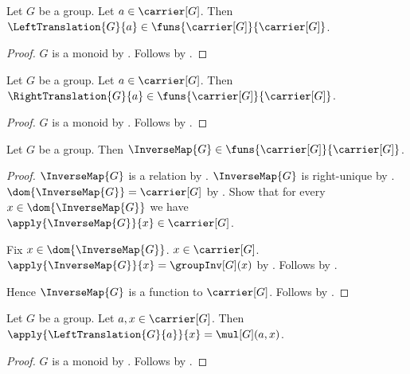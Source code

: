\begin{proposition}\label{left_translation_function}
    Let $G$ be a group.
    Let $a\in\carrier[G]$.
    Then $\LeftTranslation{G}{a}\in
        \funs{\carrier[G]}{\carrier[G]}$.
\end{proposition}
\begin{proof}
    $G$ is a monoid by .
    Follows by .
\end{proof}

\begin{proposition}\label{right_translation_function}
    Let $G$ be a group.
    Let $a\in\carrier[G]$.
    Then $\RightTranslation{G}{a}\in
        \funs{\carrier[G]}{\carrier[G]}$.
\end{proposition}
\begin{proof}
    $G$ is a monoid by .
    Follows by .
\end{proof}

\begin{proposition}\label{inverse_map_function}
    Let $G$ be a group.
    Then $\InverseMap{G}\in\funs{\carrier[G]}{\carrier[G]}$.
\end{proposition}
\begin{proof}
    $\InverseMap{G}$ is a relation
        by .
    $\InverseMap{G}$ is right-unique
        by .
    $\dom{\InverseMap{G}}=\carrier[G]$
        by .
    Show that for every $x\in\dom{\InverseMap{G}}$ we have
        $\apply{\InverseMap{G}}{x}\in\carrier[G]$.
    \begin{subproof}
        Fix $x\in\dom{\InverseMap{G}}$.
        $x\in\carrier[G]$.
        $\apply{\InverseMap{G}}{x}=\groupInv[G](x)$
            by .
        Follows by .
    \end{subproof}
    Hence $\InverseMap{G}$ is a function to $\carrier[G]$.
    Follows by .
\end{proof}

\begin{proposition}\label{left_translation_apply}
    Let $G$ be a group.
    Let $a,x\in\carrier[G]$.
    Then $\apply{\LeftTranslation{G}{a}}{x}=\mul[G](a,x)$.
\end{proposition}
\begin{proof}
    $G$ is a monoid by .
    Follows by .
\end{proof}

